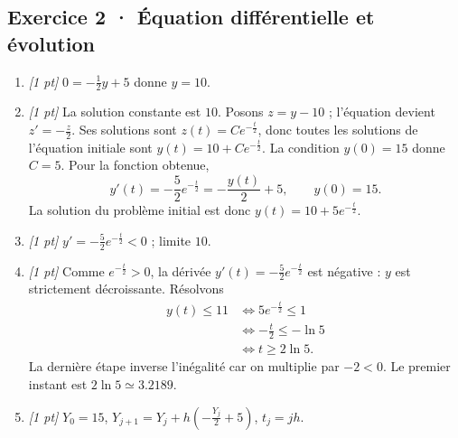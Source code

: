 \subsection*{Exercice 2 · Équation différentielle et évolution}\begin{enumerate}

\item \textit{[1 pt]} $0=-\frac{1}{2}y+5$ donne $y=10$.

\item \textit{[1 pt]} La solution constante est $10$. Posons $z=y-10$ ; l'équation devient $z'=-\frac{z}{2}$. Ses solutions sont $z(t)=Ce^{-\frac{t}{2}}$, donc toutes les solutions de l'équation initiale sont $y(t)=10+Ce^{-\frac{t}{2}}$.
La condition $y(0)=15$ donne $C=5$. Pour la fonction obtenue,
\[y'(t)=-\frac{5}{2}e^{-\frac{t}{2}}=-\frac{y(t)}{2}+5,\qquad y(0)=15.\]
La solution du problème initial est donc $y(t)=10+5e^{-\frac{t}{2}}$.

\item \textit{[1 pt]} $y'=-\frac{5}{2}e^{-\frac{t}{2}}<0$ ; limite $10$.

\item \textit{[1 pt]} Comme $e^{-\frac{t}{2}}>0$, la dérivée $y'(t)=-\frac{5}{2}e^{-\frac{t}{2}}$ est négative : $y$ est strictement décroissante. Résolvons
\[\begin{aligned}y(t)\le 11&\Longleftrightarrow 5e^{-\frac{t}{2}}\le1\\&\Longleftrightarrow -\frac{t}{2}\le-\ln 5\\&\Longleftrightarrow t\ge 2\ln 5.\end{aligned}\]
La dernière étape inverse l'inégalité car on multiplie par $-2<0$. Le premier instant est $2\ln 5\simeq\num{3,2189}$.

\item \textit{[1 pt]} $Y_0=15$, $Y_{j+1}=Y_j+h(-\frac{Y_j}{2}+5)$, $t_j=jh$.

\end{enumerate}

